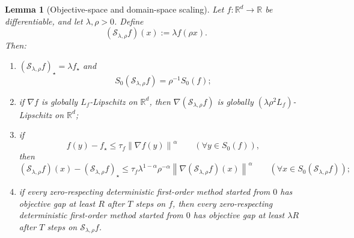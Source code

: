 \documentclass[11pt]{article}
\newtheorem{lemma}[theorem]{Lemma}
\newcommand{\R}{\mathbb{R}}
\newcommand{\norm}[1]{\left\lVert #1\right\rVert}
\begin{document}
\begin{lemma}[Objective-space and domain-space scaling]
\label{lem:scaling}
Let $f:\R^d\to\R$ be differentiable, and let $\lambda,\rho>0$.
Define
\[
(\mathcal S_{\lambda,\rho}f)(x):=\lambda f(\rho x).
\]
Then:
\begin{enumerate}[label=(\roman*),leftmargin=1.5em]
    \item $(\mathcal S_{\lambda,\rho}f)_\star=\lambda f_\star$ and
    \[
    S_0(\mathcal S_{\lambda,\rho}f)=\rho^{-1}S_0(f);
    \]
    \item if $\nabla f$ is globally $L_f$-Lipschitz on $\R^d$, then $\nabla(\mathcal S_{\lambda,\rho}f)$ is globally $(\lambda\rho^2L_f)$-Lipschitz on $\R^d$;
    \item if
    \[
    f(y)-f_\star\le \tau_f \norm{\nabla f(y)}^\alpha
    \qquad (\forall y\in S_0(f)),
    \]
    then
    \[
    (\mathcal S_{\lambda,\rho}f)(x)-(\mathcal S_{\lambda,\rho}f)_\star
    \le
    \tau_f\lambda^{1-\alpha}\rho^{-\alpha}
    \norm{\nabla(\mathcal S_{\lambda,\rho}f)(x)}^\alpha
    \qquad (\forall x\in S_0(\mathcal S_{\lambda,\rho}f));
    \]
    \item if every zero-respecting deterministic first-order method started from \(0\) has objective gap at least \(R\)
    after \(T\) steps on \(f\), then every zero-respecting deterministic first-order method started from \(0\) has
    objective gap at least \(\lambda R\) after \(T\) steps on \(\mathcal S_{\lambda,\rho}f\).
\end{enumerate}
\end{lemma}
\end{document}
